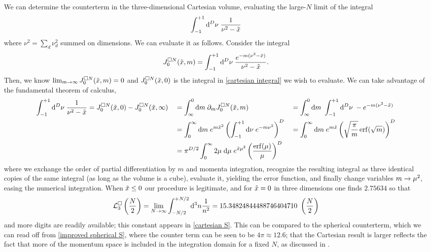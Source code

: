 We can determine the counterterm in the three-dimensional Cartesian volume, evaluating the large-$N$ limit of the integral
\begin{equation}\label{eq:cartesian integral}
    \int_{-1}^{+1} \mathrm{d}^D\nu\; \frac{1}{\nu^2 - \tilde{x}}
\end{equation}
where $\nu^2 = \sum_d \nu_d^2$ summed on dimensions.
We can evaluate it as follows.  Consider the integral
\begin{equation}
	J^{\square N}_0(\tilde{x}, m) = \int_{-1}^{+1} \mathrm{d}^D\nu\; \frac{e^{-m (\nu^2-\tilde{x})}}{\nu^2-\tilde{x}}.
\end{equation}
Then, we know $\lim_{m\rightarrow\infty} J^{\square N}_0(\tilde{x}, m) = 0$ and $J^{\square N}_0(\tilde{x}, 0)$ is the integral in \eqref{cartesian integral} we wish to evaluate.
We can take advantage of the fundamental theorem of calculus,
\begin{align}
	\int_{-1}^{+1} \mathrm{d}^D\nu\; \frac{1}{\nu^2-\tilde{x}}
    &=
    J^{\square N}_0(\tilde{x},0) - J^{\square N}_0(\tilde{x},\infty)
		&&= 	\int_{\infty}^{0} \mathrm{d}m\; \partial_m J^{\square N}_0(\tilde{x},m)
		&&=	\int_{\infty}^{0} \mathrm{d}m\ \int_{-1}^{+1} \mathrm{d}^D\nu\; -e^{-m (\nu^2-\tilde{x})}
		\nonumber\\
		&&&=	\int_0^\infty \mathrm{d}m\; e^{m \tilde{x}^2}\left(\int_{-1}^{+1} \mathrm{d}\nu\; e^{-m \nu^2}\right)^D
		&&=	\int_0^\infty \mathrm{d}m\; e^{m\tilde{x}}\left(\sqrt{\frac{\pi}{m}} \operatorname{erf}(\sqrt{m})\right)^D
        \nonumber\\
    &&&=
    \pi^{D/2} \int_{0}^{\infty} 2\mu\; \mathrm{d}\mu\; e^{\tilde{x} \mu^2} \left(\frac{\operatorname{erf}(\mu)}{\mu}\right)^D
\end{align}
where we exchange the order of partial differentiation by $m$ and momenta integration, recognize the resulting integral as three identical copies of the same integral (as long as the volume is a cube), evaluate it, yielding the error function, and finally change variables $m\rightarrow\mu^2$, easing the numerical integration.
When $\tilde{x}\leq0$ our procedure is legitimate, and for $\tilde{x}=0$ in three dimensions one finds $2.75634$ so that
\begin{equation}
    \label{eq:cartesian counterterm}
    \mathcal{L}^\square_3 \left(\frac{N}{2}\right) = \lim_{N\rightarrow\infty}\int_{-N/2}^{+N/2} \mathrm{d}^3n \frac{1}{n^2} = 15.34824844488746404710\ \left(\frac{N}{2}\right)
\end{equation}
and more digits are readily available; this constant appears in \eqref{cartesian S}.
This can be compared to the spherical counterterm, which we can read off from \eqref{improved spherical S}, where the counter term can be seen to be $4\pi \approx 12.6 $; that the Cartesian result is larger reflects the fact that more of the momentum space is included in the integration domain for a fixed $N$, as discussed in .

